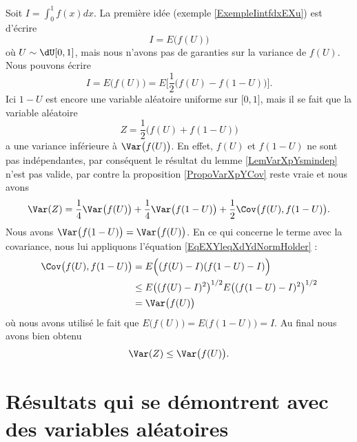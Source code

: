 Soit \( I=\int_0^1f(x)dx\). La première idée (exemple \ref{ExempleIintfdxEXu}) est d'écrire 
\begin{equation}
    I=E\big( f(U) \big)
\end{equation}
où \( U\sim\dU\mathopen[ 0 , 1 \mathclose]\), mais nous n'avons pas de garanties sur la variance de \( f(U)\). Nous pouvons écrire
\begin{equation}
    I=E\big( f(U) \big)=E\Big[ \frac{ 1 }{2}\big( f(U)-f(1-U) \big) \Big].
\end{equation}
Ici \( 1-U\) est encore une variable aléatoire uniforme sur \( \mathopen[ 0 , 1 \mathclose]\), mais il se fait que la variable aléatoire
\begin{equation}
    Z=\frac{ 1 }{2}\big( f(U)+f(1-U) \big)
\end{equation}
a une variance inférieure à \( \Var\big( f(U) \big)\). En effet, \( f(U)\) et \( f(1-U)\) ne sont pas indépendantes, par conséquent le résultat du lemme \ref{LemVarXpYsmindep} n'est pas valide, par contre la proposition \ref{PropoVarXpYCov} reste vraie et nous avons
\begin{equation}
    \Var(Z)=\frac{1}{ 4 }\Var\big( f(U) \big)+\frac{1}{ 4 }\Var\big( f(1-U) \big)+\frac{ 1 }{2}\Cov\big( f(U),f(1-U) \big).
\end{equation}
Nous avons \( \Var\big( f(1-U) \big)=\Var\big( f(U) \big)\). En ce qui concerne le terme avec la covariance, nous lui appliquons l'équation \eqref{EqEXYleqXdYdNormHolder} :
\begin{subequations}
    \begin{align}
        \Cov\big( f(U),f(1-U) \big)&=E\Big( (f(U)-I)(f(1-U)-I) \Big)\\
        &\leq E\big( (f(U)-I)^2 \big)^{1/2}E\big( (f(1-U)-I)^2 \big)^{1/2}\\
        &=\Var\big( f(U) \big)
    \end{align}
\end{subequations}
où nous avons utilisé le fait que \( E\big( f(U) \big)=E\big( f(1-U) \big)=I\). Au final nous avons bien obtenu
\begin{equation}
    \Var(Z)\leq \Var\big( f(U) \big).
\end{equation}

\section{Résultats qui se démontrent avec des variables aléatoires}

